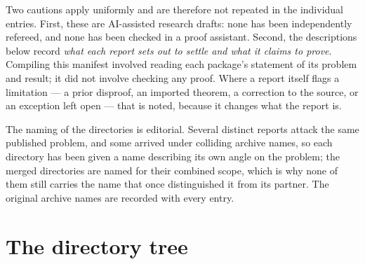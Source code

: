 \documentclass[11pt]{article}
\begin{document}
Two cautions apply uniformly and are therefore not repeated in the individual
entries.  First, these are AI-assisted research drafts: none has been
independently refereed, and none has been checked in a proof assistant.  Second,
the descriptions below record \emph{what each report sets out to settle and what
it claims to prove}.  Compiling this manifest involved reading each package's
statement of its problem and result; it did not involve checking any proof.
Where a report itself flags a limitation --- a prior disproof, an imported
theorem, a correction to the source, or an exception left open --- that is noted,
because it changes what the report is.

The naming of the directories is editorial.  Several distinct reports attack the
same published problem, and some arrived under colliding archive names, so each
directory has been given a name describing its own angle on the problem; the
merged directories are named for their combined scope, which is why none of them
still carries the name that once distinguished it from its partner.  The
original archive names are recorded with every entry.

\clearpage
\section{The directory tree}
\label{sec:tree}
\end{document}
